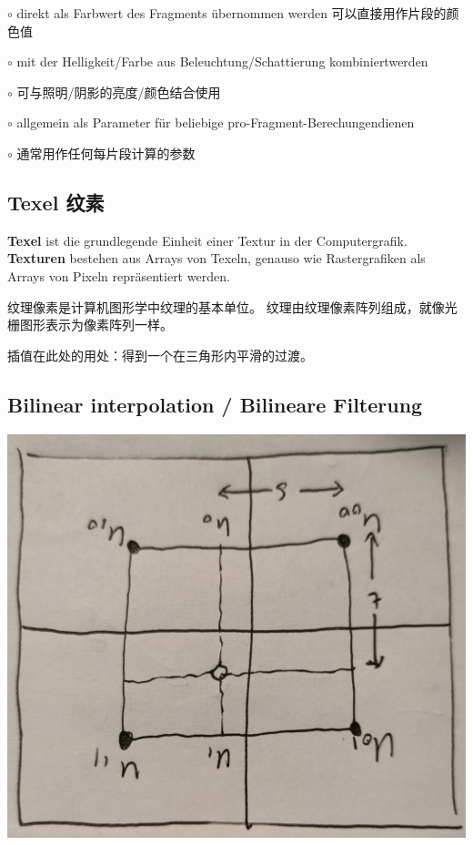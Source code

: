 \documentclass[fleqn]{article}
\begin{document}
$\circ$ direkt als Farbwert des Fragments übernommen werden 可以直接用作片段的颜色值

$\circ$ mit der Helligkeit/Farbe aus Beleuchtung/Schattierung kombiniertwerden

$\circ$ 可与照明/阴影的亮度/颜色结合使用

$\circ$ allgemein als Parameter für beliebige pro-Fragment-Berechungendienen

$\circ$ 通常用作任何每片段计算的参数


\subsection{Texel 纹素}

\textbf{Texel} ist die grundlegende Einheit einer Textur in der Computergrafik. \textbf{Texturen} bestehen aus Arrays von Texeln, genauso wie Rastergrafiken als Arrays von Pixeln repräsentiert werden.

纹理像素是计算机图形学中纹理的基本单位。 纹理由纹理像素阵列组成，就像光栅图形表示为像素阵列一样。

\noindent 插值在此处的用处：得到一个在三角形内平滑的过渡。

\subsection{Bilinear interpolation / Bilineare Filterung}

\begin{center}
    \includegraphics[angle=180,scale=0.05]{23.jpg}
\end{center}
\end{document}
